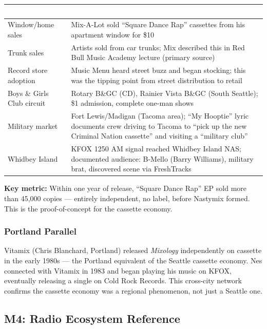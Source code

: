\documentclass[11pt,letterpaper]{article}
\newcommand{\tableheader}[1]{\textbf{\sffamily\textcolor{white}{#1}}}
\begin{document}
\begin{center}
\begin{tabularx}{\textwidth}{L{3cm}X}
\toprule
{}
\tableheader{Channel} & \tableheader{Detail} \\
\midrule
Window/home sales & Mix-A-Lot sold ``Square Dance Rap'' cassettes from his apartment window for \$10 \\
Trunk sales & Artists sold from car trunks; Mix described this in Red Bull Music Academy lecture (primary source) \\
Record store adoption & Music Menu heard street buzz and began stocking; this was the tipping point from street distribution to retail \\
Boys \& Girls Club circuit & Rotary B\&GC (CD), Rainier Vista B\&GC (South Seattle); \$1 admission, complete one-man shows \\
Military market & Fort Lewis/Madigan (Tacoma area); ``My Hooptie'' lyric documents crew driving to Tacoma to ``pick up the new Criminal Nation cassette'' and visiting a ``military club'' \\
Whidbey Island & KFOX 1250 AM signal reached Whidbey Island NAS; documented audience: B-Mello (Barry Williams), military brat, discovered scene via FreshTracks \\
\bottomrule
\end{tabularx}
\end{center}

\textbf{Key metric:} Within one year of release, ``Square Dance Rap'' EP sold more than 45,000 copies --- entirely independent, no label, before Nastymix formed. This is the proof-of-concept for the cassette economy.

\subsubsection{Portland Parallel}

Vitamix (Chris Blanchard, Portland) released \textit{Mixology} independently on cassette in the early 1980s --- the Portland equivalent of the Seattle cassette economy. Nes connected with Vitamix in 1983 and began playing his music on KFOX, eventually releasing a single on Cold Rock Records. This cross-city network confirms the cassette economy was a regional phenomenon, not just a Seattle one.

\subsection{M4: Radio Ecosystem Reference}
\end{document}
